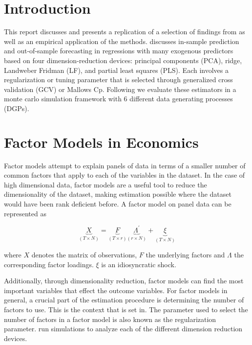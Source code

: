 \renewcommand{\contentsname}{Table of Contents}
\tableofcontents

\newpage

\section{Introduction}
This report discusses and presents a replication of a selection of findings from \citeauthor{carrasco2016sample} as well as an empirical application of the methods. \citeauthor{carrasco2016sample} discusses in-sample prediction and out-of-sample forecasting in regressions with many exogenous predictors based on four dimension-reduction devices: principal components (PCA), ridge, Landweber Fridman (LF), and partial least squares (PLS). Each involves a regularization or tuning parameter that is selected through generalized cross validation (GCV) or Mallows Cp. Following \citeauthor{carrasco2016sample} we evaluate these estimators in a monte carlo simulation framework with 6 different data generating processes (DGPs). 

\section{Factor Models in Economics}

Factor models attempt to explain panels of data in terms of a smaller number of common factors that apply to each of the variables in the dataset. In the case of high dimensional data, factor models are a useful tool to reduce the dimensionality of the dataset, making estimation possible where the dataset would have been rank deficient before. A factor model on panel data can be represented as

\[\underbrace{X}_{(T \times N)} = \underbrace{F}_{(T \times r)} \underbrace{\Lambda^{'}}_{(r \times N)} + \underbrace{\xi}_{(T \times N)}\]

where $X$ denotes the matrix of observations, $F$ the underlying factors and $\Lambda$ the corresponding factor loadings. $\xi$ is an idiosyncratic shock. 

Additionally, through dimensionality reduction, factor models can find the most important variables that effect the outcome variables.
For factor models in general, a crucial part of the estimation procedure is determining the number of factors to use. This is the context that \citeauthor{carrasco2016sample} is set in. The parameter used to select the number of factors in a factor model is also known as the regularization parameter. \citeauthor{carrasco2016sample} run simulations to analyze each of the different dimension reduction devices. 

